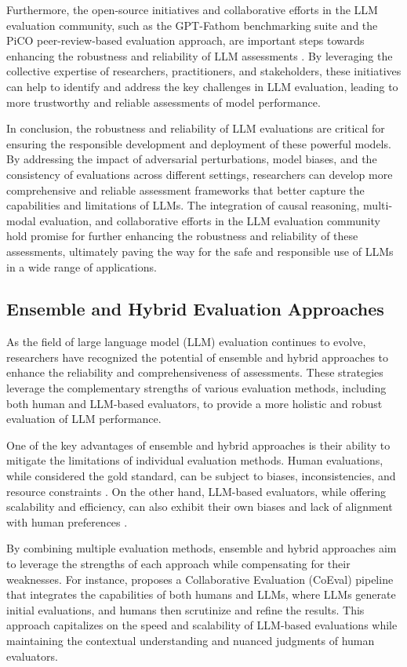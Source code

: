 \documentclass[11pt]{article}
\begin{document}
Furthermore, the open-source initiatives and collaborative efforts in the LLM evaluation community, such as the GPT-Fathom benchmarking suite and the PiCO peer-review-based evaluation approach, are important steps towards enhancing the robustness and reliability of LLM assessments \cite{ref83,ref107}. By leveraging the collective expertise of researchers, practitioners, and stakeholders, these initiatives can help to identify and address the key challenges in LLM evaluation, leading to more trustworthy and reliable assessments of model performance.

In conclusion, the robustness and reliability of LLM evaluations are critical for ensuring the responsible development and deployment of these powerful models. By addressing the impact of adversarial perturbations, model biases, and the consistency of evaluations across different settings, researchers can develop more comprehensive and reliable assessment frameworks that better capture the capabilities and limitations of LLMs. The integration of causal reasoning, multi-modal evaluation, and collaborative efforts in the LLM evaluation community hold promise for further enhancing the robustness and reliability of these assessments, ultimately paving the way for the safe and responsible use of LLMs in a wide range of applications.

\subsection{Ensemble and Hybrid Evaluation Approaches}

As the field of large language model (LLM) evaluation continues to evolve, researchers have recognized the potential of ensemble and hybrid approaches to enhance the reliability and comprehensiveness of assessments. These strategies leverage the complementary strengths of various evaluation methods, including both human and LLM-based evaluators, to provide a more holistic and robust evaluation of LLM performance.

One of the key advantages of ensemble and hybrid approaches is their ability to mitigate the limitations of individual evaluation methods. Human evaluations, while considered the gold standard, can be subject to biases, inconsistencies, and resource constraints \cite{ref141,ref142}. On the other hand, LLM-based evaluators, while offering scalability and efficiency, can also exhibit their own biases and lack of alignment with human preferences \cite{ref143,ref103}.

By combining multiple evaluation methods, ensemble and hybrid approaches aim to leverage the strengths of each approach while compensating for their weaknesses. For instance, \cite{ref144} proposes a Collaborative Evaluation (CoEval) pipeline that integrates the capabilities of both humans and LLMs, where LLMs generate initial evaluations, and humans then scrutinize and refine the results. This approach capitalizes on the speed and scalability of LLM-based evaluations while maintaining the contextual understanding and nuanced judgments of human evaluators.
\end{document}
